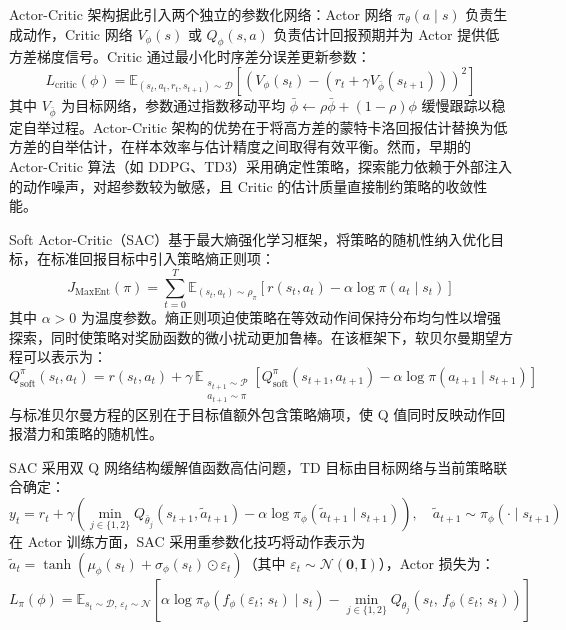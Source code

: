 Actor-Critic 架构据此引入两个独立的参数化网络：Actor 网络 $\pi_\theta(a \mid s)$ 负责生成动作，Critic 网络 $V_\phi(s)$ 或 $Q_\phi(s, a)$ 负责估计回报预期并为 Actor 提供低方差梯度信号。Critic 通过最小化时序差分误差更新参数：
\begin{equation}
    L_{\mathrm{critic}}(\phi) = \mathbb{E}_{(s_t, a_t, r_t, s_{t+1}) \sim \mathcal{D}} \left[ \left( V_\phi(s_t) - \left( r_t + \gamma V_{\bar{\phi}}(s_{t+1}) \right) \right)^2 \right]
\end{equation}
其中 $V_{\bar{\phi}}$ 为目标网络，参数通过指数移动平均 $\bar{\phi} \leftarrow \rho \bar{\phi} + (1-\rho)\phi$ 缓慢跟踪以稳定自举过程。Actor-Critic 架构的优势在于将高方差的蒙特卡洛回报估计替换为低方差的自举估计，在样本效率与估计精度之间取得有效平衡。然而，早期的 Actor-Critic 算法\cite{lillicrap2015continuous}\cite{fujimoto2018addressing}（如 DDPG、TD3）采用确定性策略，探索能力依赖于外部注入的动作噪声，对超参数较为敏感，且 Critic 的估计质量直接制约策略的收敛性能。


Soft Actor-Critic（SAC）\cite{haarnoja2018soft}基于最大熵强化学习框架，将策略的随机性纳入优化目标，在标准回报目标中引入策略熵正则项：
\begin{equation}
    J_{\mathrm{MaxEnt}}(\pi) = \sum_{t=0}^{T} \mathbb{E}_{(s_t, a_t) \sim \rho_\pi} \left[ r(s_t, a_t) - \alpha \log \pi(a_t \mid s_t) \right]
\end{equation}
其中 $\alpha > 0$ 为温度参数。熵正则项迫使策略在等效动作间保持分布均匀性以增强探索，同时使策略对奖励函数的微小扰动更加鲁棒。在该框架下，软贝尔曼期望方程可以表示为：
\begin{equation}
    Q^\pi_{\mathrm{soft}}(s_t, a_t) = r(s_t, a_t) + \gamma \,\mathbb{E}_{\substack{s_{t+1} \sim \mathcal{P} \\ a_{t+1} \sim \pi}} \!\left[ Q^\pi_{\mathrm{soft}}(s_{t+1}, a_{t+1}) - \alpha \log \pi(a_{t+1} \mid s_{t+1}) \right]
\end{equation}
与标准贝尔曼方程的区别在于目标值额外包含策略熵项，使 Q 值同时反映动作回报潜力和策略的随机性。

SAC 采用双 Q 网络结构缓解值函数高估问题，TD 目标由目标网络与当前策略联合确定：
\begin{equation}
    y_t = r_t + \gamma \left( \min_{j \in \{1,2\}} Q_{\bar{\theta}_j}(s_{t+1}, \tilde{a}_{t+1}) - \alpha \log \pi_\phi(\tilde{a}_{t+1} \mid s_{t+1}) \right), \quad \tilde{a}_{t+1} \sim \pi_\phi(\cdot \mid s_{t+1})
\end{equation}
在 Actor 训练方面，SAC 采用重参数化技巧将动作表示为 $\tilde{a}_t = \tanh(\mu_\phi(s_t) + \sigma_\phi(s_t) \odot \varepsilon_t)$（其中 $\varepsilon_t \sim \mathcal{N}(\mathbf{0}, \mathbf{I})$），Actor 损失为：
\begin{equation}
    L_\pi(\phi) = \mathbb{E}_{s_t \sim \mathcal{D},\, \varepsilon_t \sim \mathcal{N}} \left[ \alpha \log \pi_\phi\!\left( f_\phi(\varepsilon_t;\, s_t) \mid s_t \right) - \min_{j \in \{1,2\}} Q_{\theta_j}\!\left( s_t,\, f_\phi(\varepsilon_t;\, s_t) \right) \right]
\end{equation}

